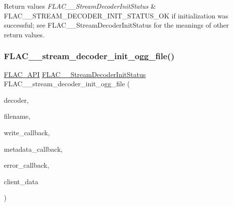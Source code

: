 \begin{DoxyRetVals}{Return values}
{\em F\+L\+A\+C\+\_\+\+\_\+\+Stream\+Decoder\+Init\+Status} & {\ttfamily F\+L\+A\+C\+\_\+\+\_\+\+S\+T\+R\+E\+A\+M\+\_\+\+D\+E\+C\+O\+D\+E\+R\+\_\+\+I\+N\+I\+T\+\_\+\+S\+T\+A\+T\+U\+S\+\_\+\+OK} if initialization was successful; see F\+L\+A\+C\+\_\+\+\_\+\+Stream\+Decoder\+Init\+Status for the meanings of other return values. \\
\hline
\end{DoxyRetVals}
\mbox{\label{group__flac__stream__decoder_ga609f2a43987d6abeaef654575462030c}} 
\subsubsection{\texorpdfstring{F\+L\+A\+C\+\_\+\+\_\+stream\+\_\+decoder\+\_\+init\+\_\+ogg\+\_\+file()}{FLAC\_\_stream\_decoder\_init\_ogg\_file()}}
{\footnotesize\ttfamily \hyperlink{group__flac__export_ga56ca07df8a23310707732b1c0007d6f5}{F\+L\+A\+C\+\_\+\+A\+PI} \hyperlink{group__flac__stream__decoder_gaaed54a24ac6310d29c5cafba79759c44}{F\+L\+A\+C\+\_\+\+\_\+\+Stream\+Decoder\+Init\+Status} F\+L\+A\+C\+\_\+\+\_\+stream\+\_\+decoder\+\_\+init\+\_\+ogg\+\_\+file (\begin{DoxyParamCaption}\item[{\hyperlink{struct_f_l_a_c_____stream_decoder}{F\+L\+A\+C\+\_\+\+\_\+\+Stream\+Decoder} $\ast$}]{decoder,  }\item[{\hyperlink{zconf_8h_a2c212835823e3c54a8ab6d95c652660e}{const} char $\ast$}]{filename,  }\item[{\hyperlink{group__flac__stream__decoder_ga61e48dc2c0d2f6c5519290ff046874a4}{F\+L\+A\+C\+\_\+\+\_\+\+Stream\+Decoder\+Write\+Callback}}]{write\+\_\+callback,  }\item[{\hyperlink{group__flac__stream__decoder_ga6aa87c01744c1c601b7f371f627b6e14}{F\+L\+A\+C\+\_\+\+\_\+\+Stream\+Decoder\+Metadata\+Callback}}]{metadata\+\_\+callback,  }\item[{\hyperlink{group__flac__stream__decoder_gac896ee6a12668e9015fab4fbc6aae996}{F\+L\+A\+C\+\_\+\+\_\+\+Stream\+Decoder\+Error\+Callback}}]{error\+\_\+callback,  }\item[{\hyperlink{png_8h_ac9c84fa68bbad002983e35ce3663c686}{void} $\ast$}]{client\+\_\+data }\end{DoxyParamCaption})}

